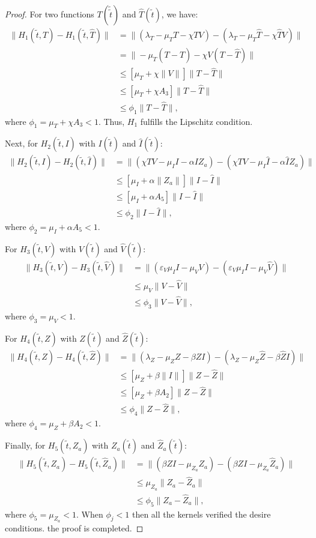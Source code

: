 \documentclass[10pt,a4paper]{amsart}
\numberwithin{equation}{section}
\begin{document}
\begin{proof}
For two functions $T(\tilde{\tilde{t}})$ and $\hat{T}(\tilde{t})$, we have:
	\begin{align*}
		\|H_1(\tilde{t}, T) - H_1(\tilde{t}, \hat{T})\| &= \|(\lambda_T - \mu_T T - \chi TV) - (\lambda_T - \mu_T \hat{T} - \chi \hat{T}V)\| \\
		&= \|-\mu_T(T - \hat{T}) - \chi V(T - \hat{T})\| \\
		&\leq [\mu_T + \chi \|V\|] \|T - \hat{T}\| \\
		&\leq [\mu_T + \chi A_3] \|T - \hat{T}\| \\
		&\leq \phi_1 \|T - \hat{T}\|,
	\end{align*}
	where $\phi_1 = \mu_T + \chi A_3 < 1$. Thus, $H_1$ fulfills the Lipschitz condition.
	
	Next, for $H_2(\tilde{t}, I)$ with $I(\tilde{t})$ and $\hat{I}(\tilde{t})$:
	\begin{align*}
		\|H_2(\tilde{t}, I) - H_2(\tilde{t}, \hat{I})\| &= \|(\chi TV - \mu_I I - \alpha I Z_a) - (\chi TV - \mu_I \hat{I} - \alpha \hat{I} Z_a)\| \\
		&\leq [\mu_I + \alpha \|Z_a\|] \|I - \hat{I}\| \\
		&\leq [\mu_I + \alpha A_5] \|I - \hat{I}\| \\
		&\leq \phi_2 \|I - \hat{I}\|,
	\end{align*}
	where $\phi_2 = \mu_I + \alpha A_5 < 1$.
	
	For $H_3(\tilde{t}, V)$ with $V(\tilde{t})$ and $\hat{V}(\tilde{t})$:
	\begin{align*}
		\|H_3(\tilde{t}, V) - H_3(\tilde{t}, \hat{V})\| &= \|(\varepsilon_V \mu_I I - \mu_V V) - (\varepsilon_V \mu_I I - \mu_V \hat{V})\| \\
		&\leq \mu_V \|V - \hat{V}\| \\
		&\leq \phi_3 \|V - \hat{V}\|,
	\end{align*}
	where $\phi_3 = \mu_V < 1$.
	
	For $H_4(\tilde{t}, Z)$ with $Z(\tilde{t})$ and $\hat{Z}(\tilde{t})$:
	\begin{align*}
		\|H_4(\tilde{t}, Z) - H_4(\tilde{t}, \hat{Z})\| &= \|(\lambda_Z - \mu_Z Z - \beta Z I) - (\lambda_Z - \mu_Z \hat{Z} - \beta \hat{Z} I)\| \\
		&\leq [\mu_Z + \beta \|I\|] \|Z - \hat{Z}\| \\
		&\leq [\mu_Z + \beta A_2] \|Z - \hat{Z}\| \\
		&\leq \phi_4 \|Z - \hat{Z}\|,
	\end{align*}
	where $\phi_4 = \mu_Z + \beta A_2 < 1$.
	
	Finally, for $H_5(\tilde{t}, Z_a)$ with $Z_{a}(\tilde{t})$ and $\hat{Z}_a(\tilde{t})$:
	\begin{align*}
		\|H_5(\tilde{t}, Z_a) - H_5(\tilde{t}, \hat{Z}_a)\| &= \|(\beta Z I - \mu_{Z_a} Z_a) - (\beta Z I - \mu_{Z_a} \hat{Z}_a)\| \\
		&\leq \mu_{Z_a} \|Z_a - \hat{Z}_a\| \\
		&\leq \phi_5 \|Z_a - \hat{Z}_a\|,
	\end{align*}
	where $\phi_5 = \mu_{Z_a} < 1$.
    When $\phi_j < 1$ then all the kernels verified the desire conditions.  the proof is completed.
\end{proof}
\end{document}
